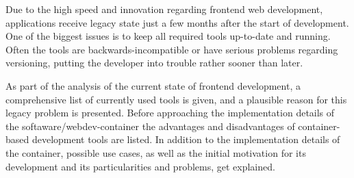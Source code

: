 Due to the high speed and innovation regarding frontend web development, applications receive legacy state just a few months after the start of development.
One of the biggest issues is to keep all required tools up-to-date and running.
Often the tools are backwards-incompatible or have serious problems regarding versioning, putting the developer into trouble rather sooner than later.

As part of the analysis of the current state of frontend development, a comprehensive list of currently used tools is given, and a plausible reason for this legacy problem is presented.
Before approaching the implementation details of the softaware/webdev-container the advantages and disadvantages of container-based development tools are listed.
In addition to the implementation details of the container, possible use cases, as well as the initial motivation for its development and its particularities and problems, get explained.
